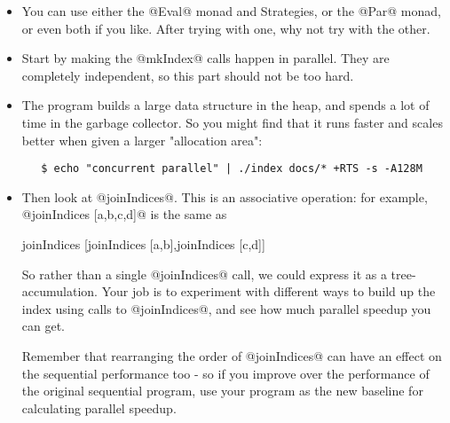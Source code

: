 \documentclass[11pt,a4paper]{article}
\begin{document}
\begin{itemize}
\item You can use either the @Eval@ monad and Strategies, or the @Par@
monad, or even both if you like.  After trying with one, why not try
with the other.

\item Start by making the @mkIndex@ calls happen in parallel.  They
are completely independent, so this part should not be too hard.

\item The program builds a large data structure in the heap, and
spends a lot of time in the garbage collector.  So you might find that
it runs faster and scales better when given a larger "allocation
area":

   \begin{verbatim}
   $ echo "concurrent parallel" | ./index docs/* +RTS -s -A128M
   \end{verbatim}

\item Then look at @joinIndices@.  This is an associative operation:
for example, @joinIndices [a,b,c,d]@ is the same as

\begin{haskell}
  joinIndices [joinIndices [a,b],joinIndices [c,d]]
\end{haskell}

  So rather than a single @joinIndices@ call, we could express it as a
  tree-accumulation.  Your job is to experiment with different ways to
  build up the index using calls to @joinIndices@, and see how much
  parallel speedup you can get.

  Remember that rearranging the order of @joinIndices@ can have an
  effect on the sequential performance too - so if you improve over
  the performance of the original sequential program, use your program
  as the new baseline for calculating parallel speedup.
\end{itemize}
\end{document}
